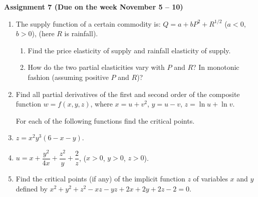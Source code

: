 \documentclass{article}
\begin{document}
\fontsize{14}{21}
\selectfont
\centerline{\textbf{Assignment 7 (Due on the week November 5 -- 10)}}
\fontsize{12}{18}
\selectfont

\begin{enumerate}
\item The supply function of a certain commodity is: $Q = a + bP^2 + R^{1/2}$ ($a<0$, $b>0$), (here $R$ is rainfall).
\begin{enumerate}
\item Find the price elasticity of supply and rainfall elasticity of supply.
\item How do the two partial elasticities vary with $P$ and $R$? In monotonic fashion (assuming positive $P$ and $R$)?
\end{enumerate}
\item Find all partial derivatives of the first and second order of the composite function $w=f(x,y,z)$, where $x=u+v^2$, $y=u-v$, $z=\ln u +\ln v$.

\medskip
For each of the following functions find the critical points.

\item $z=x^2y^3 (6-x-y)$.
\item $u=x+\dfrac {y^2}{4x}+\dfrac{z^2}{y}+\dfrac 2z$, ($x>0$, $y>0$, $z>0$).

\item Find the critical points (if any) of the implicit function $z$ of variables $x$ and $y$ defined by $x^2+y^2+z^2-xz-yz+2x+2y+2z-2=0$.
\end{enumerate}
\end{document}
